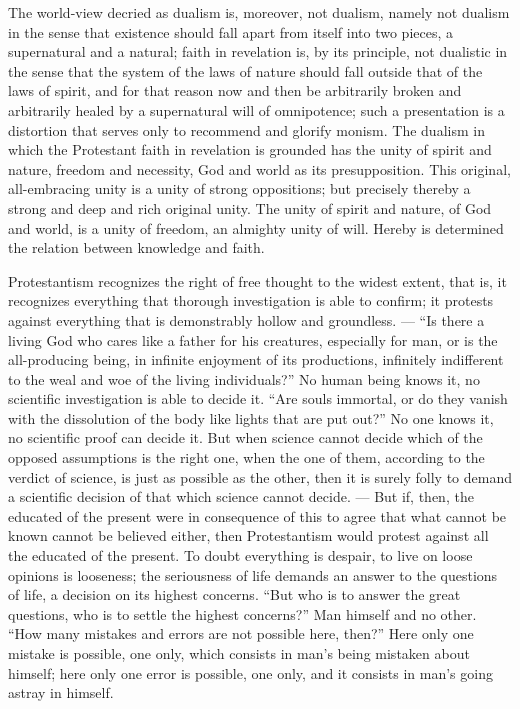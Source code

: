 \documentclass[12pt,a4paper,openany]{book}
\newcommand{\opage}[1]{\marginnote{\footnotesize\textit{[#1]}}}
\begin{document}
The world-view decried as dualism is,
moreover, not dualism, namely not dualism in the
sense that existence should fall apart from itself into two
pieces, a supernatural and a natural;
\setcounter{footnote}{0}%
\opage{66}faith in revelation is, by its principle, not dualistic in the sense
that the system of the laws of nature should fall outside
that of the laws of spirit, and for that reason now and then be arbitrarily broken and
arbitrarily healed by a supernatural will of omnipotence; such
a presentation is a distortion that serves only to
recommend and glorify monism. The
dualism in which the Protestant faith in revelation is
grounded has the unity of spirit and nature, freedom and
necessity, God and world as its presupposition. This
original, all-embracing unity is a unity of
strong oppositions; but precisely thereby a strong and
deep and rich original unity. The unity of
spirit and nature, of God and world, is a unity of
freedom, an almighty unity of will. Hereby is determined
the relation between knowledge and faith.

Protestantism recognizes the right of free thought
to the widest extent, that is, it recognizes everything
that thorough investigation is able to confirm; it
protests against everything that is demonstrably hollow and %
groundless. --- ``Is there a living God who cares like a father
for his creatures, especially for man, or is the
all-producing being, in infinite enjoyment of its
productions, infinitely indifferent to the weal and woe of the living
individuals?'' No human being knows it,
no scientific investigation is able to decide
it. ``Are souls immortal, or do they vanish with
the dissolution of the body like lights that are put out?'' No one
knows it, no scientific proof can decide it.
But when science cannot decide which of the
opposed assumptions is the right one, when the one of
them, according to the verdict of science, is just as possible
as the other, then it is surely folly to demand
\setcounter{footnote}{0}%
\opage{67}a scientific decision of that which science cannot
decide. --- But if, then, the educated of the present were in
consequence of this to agree that what cannot
be known cannot be believed either, then Protestantism would
protest against all the educated of the present. To doubt
everything is despair, to live on loose opinions is looseness;
the seriousness of life demands an answer to the questions of life,
a decision on its highest concerns.
``But who is to answer the great questions, who
is to settle the highest concerns?'' Man himself and
no other. ``How many mistakes and errors
are not possible here, then?'' Here only one mistake is
possible, one only, which consists in man's being
mistaken about himself; here only one error is possible, one
only, and it consists in man's going astray in
himself.
\end{document}
